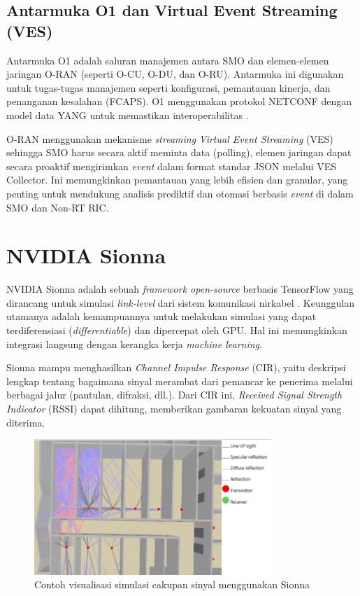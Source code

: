 \subsection{Antarmuka O1 dan Virtual Event Streaming (VES)}
Antarmuka O1 adalah saluran manajemen antara SMO dan elemen-elemen jaringan O-RAN (seperti O-CU, O-DU, dan O-RU). Antarmuka ini digunakan untuk tugas-tugas manajemen seperti konfigurasi, pemantauan kinerja, dan penanganan kesalahan (FCAPS). O1 menggunakan protokol NETCONF dengan model data YANG untuk memastikan interoperabilitas \cite{oran_o1_spec_2024}.

O-RAN menggunakan mekanisme \textit{streaming} \textit{Virtual Event Streaming} (VES) sehingga SMO harus secara aktif meminta data (polling), elemen jaringan dapat secara proaktif mengirimkan \textit{event} dalam format standar JSON melalui VES Collector. Ini memungkinkan pemantauan  yang lebih efisien dan granular, yang penting untuk mendukung analisis prediktif dan otomasi berbasis \textit{event} di dalam SMO dan Non-RT RIC.

\section{NVIDIA Sionna}
NVIDIA Sionna adalah sebuah \textit{framework open-source} berbasis TensorFlow yang dirancang untuk simulasi \textit{link-level} dari sistem komunikasi nirkabel \cite{nvidia_sionna, nvidia_sionna_rt}. Keunggulan utamanya adalah kemampuannya untuk melakukan simulasi yang dapat terdiferensiasi (\textit{differentiable}) dan dipercepat oleh GPU. Hal ini memungkinkan integrasi langsung dengan kerangka kerja \textit{machine learning}.

Sionna mampu menghasilkan \textit{Channel Impulse Response} (CIR), yaitu deskripsi lengkap tentang bagaimana sinyal merambat dari pemancar ke penerima melalui berbagai jalur (pantulan, difraksi, dll.). Dari CIR ini, \textit{Received Signal Strength Indicator} (RSSI) dapat dihitung, memberikan gambaran kekuatan sinyal yang diterima.

\begin{figure}[htbp]
    \centering
    \includegraphics[width=0.8\textwidth]{assets/pics/sionna-simulation.png}
    \caption{Contoh visualisasi simulasi cakupan sinyal menggunakan Sionna}
    \label{fig:sionna_simulation}
\end{figure}


